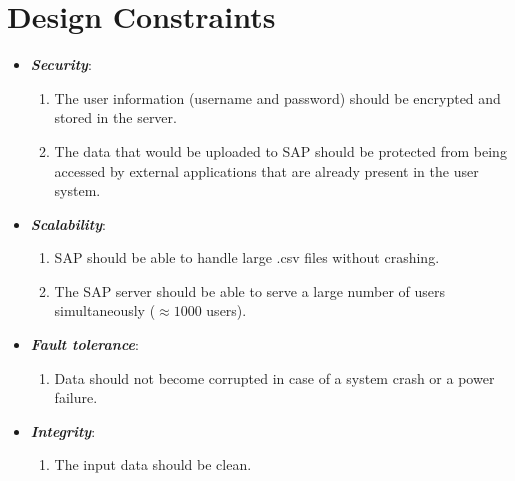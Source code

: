 \documentclass{report}
\begin{document}
\section{Design Constraints}
\begin{itemize}
    \item \textbf{\textit{Security}}: \begin{enumerate}
        \item The user information (username and password) should be encrypted and stored in the server. 
        \item The data that would be uploaded to SAP should be protected from being accessed by external applications that are already present in the user system. 
    \end{enumerate}
    \item \textbf{\textit{Scalability}}: \begin{enumerate}
        \item SAP should be able to handle large .csv files without crashing. 
        \item The SAP server should be able to serve a large number of users simultaneously ($\approx 1000$ users).
    \end{enumerate}
    \item \textbf{\textit{Fault tolerance}}: \begin{enumerate}
        \item Data should not become corrupted in case of a system crash or a power failure.
    \end{enumerate}
    \item \textbf{\textit{Integrity}}: \begin{enumerate}
        \item The input data should be clean.
    \end{enumerate}
\end{itemize}
\end{document}
